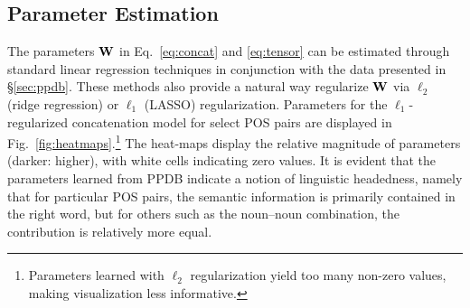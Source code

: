 \documentclass[11pt,letterpaper]{article}
\newcommand{\bW}{{\bf W}}
\begin{document}
\subsection{Parameter Estimation}
The parameters $\bW$ in Eq.~\ref{eq:concat} and \ref{eq:tensor} can be estimated through standard linear regression techniques in conjunction with the data presented in \S\ref{sec:ppdb}.
These methods also provide a natural way regularize $\bW$ via $\ell_2$ (ridge regression) or $\ell_1$ (LASSO) regularization.  
Parameters for the $\ell_1$-regularized concatenation model for select POS pairs are displayed in Fig.~\ref{fig:heatmaps}.\footnote{Parameters learned with $\ell_2$ regularization yield too many non-zero values, making visualization less informative.}  
The heat-maps display the relative magnitude of parameters (darker: higher), with white cells indicating zero values. 
It is evident that the parameters learned from PPDB indicate a notion of linguistic headedness, namely that for particular POS pairs, the semantic information is primarily contained in the right word, but for others such as the noun--noun combination, the contribution is relatively more equal. 
\end{document}
